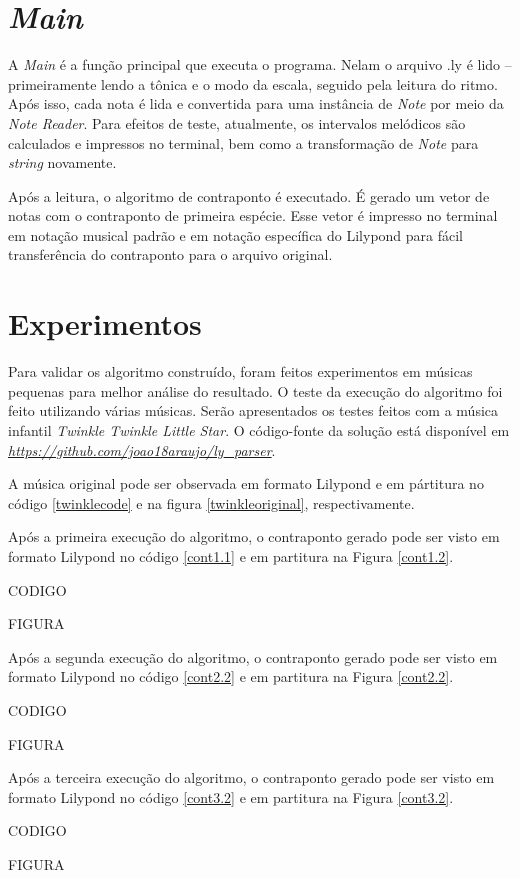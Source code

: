   \section[\textit{Main}]{\textit{Main}}

    A \textit{Main} é a função principal que executa o programa. Nelam o arquivo .ly é lido -- primeiramente lendo a tônica e o modo da escala, seguido pela leitura do ritmo. Após isso, cada nota é lida e convertida para uma instância de \textit{Note} por meio da \textit{Note Reader}. Para efeitos de teste, atualmente, os intervalos melódicos são calculados e impressos no terminal, bem como a transformação de \textit{Note} para \textit{string} novamente.

    Após a leitura, o algoritmo de contraponto é executado. É gerado um vetor de notas com o contraponto de primeira espécie. Esse vetor é impresso no terminal em notação musical padrão e em notação específica do Lilypond para fácil transferência do contraponto para o arquivo original.

  \section[Experimentos]{Experimentos}

    Para validar os algoritmo construído, foram feitos experimentos em músicas pequenas para melhor análise do resultado. O teste da execução do algoritmo foi feito utilizando várias músicas. Serão apresentados os testes feitos com a música infantil \textit{Twinkle Twinkle Little Star}. O código-fonte da solução está disponível em \textit{\url{https://github.com/joao18araujo/ly_parser}}.

    A música original pode ser observada em formato Lilypond e em pártitura no código \ref{twinklecode} e na figura \ref{twinkleoriginal}, respectivamente.

    Após a primeira execução do algoritmo, o contraponto gerado pode ser visto em formato Lilypond no código \ref{cont1.1} e em partitura na Figura \ref{cont1.2}.

    CODIGO

    FIGURA

    Após a segunda execução do algoritmo, o contraponto gerado pode ser visto em formato Lilypond no código \ref{cont2.2} e em partitura na Figura \ref{cont2.2}.

    CODIGO

    FIGURA

    Após a terceira execução do algoritmo, o contraponto gerado pode ser visto em formato Lilypond no código \ref{cont3.2} e em partitura na Figura \ref{cont3.2}.

    CODIGO

    FIGURA
